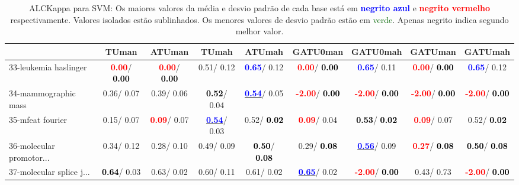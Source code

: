 \begin{table}[h]
\caption{ALCKappa para SVM: Os maiores valores da média e desvio padrão de cada base está em \textcolor{blue}{\textbf{negrito azul}} e \textcolor{red}{\textbf{negrito vermelho}} respectivamente. Valores isolados estão sublinhados. Os menores valores de desvio padrão estão em \textcolor{darkgreen}{verde}. Apenas negrito indica segundo melhor valor.}
\begin{center}\begin{tabular}{lc|c|c|c|c|c|c|c}
 & TUman & \textbf{ATUman} & TUmah & \textbf{ATUmah} & GATU0man & GATU0mah & GATUman & GATUmah\\ \hline 33-leukemia haslinger & \textcolor{red}{\textbf{  0.00}}/\textcolor{black}{\textbf{  0.00}} & \textcolor{red}{\textbf{  0.00}}/\textcolor{black}{\textbf{  0.00}} &   0.51/  0.12 & \textcolor{blue}{\textbf{  0.65}}/  0.12 & \textcolor{red}{\textbf{  0.00}}/\textcolor{black}{\textbf{  0.00}} & \textcolor{blue}{\textbf{  0.65}}/  0.11 & \textcolor{red}{\textbf{  0.00}}/\textcolor{black}{\textbf{  0.00}} & \textcolor{blue}{\textbf{  0.65}}/  0.12 \\
34-mammographic mass &   0.36/  0.07 &   0.39/  0.06 & \textcolor{black}{\textbf{  0.52}}/  0.04 & \underline{\textcolor{blue}{\textbf{  0.54}}}/  0.05 & \textcolor{red}{\textbf{ -2.00}}/\textcolor{black}{\textbf{  0.00}} & \textcolor{red}{\textbf{ -2.00}}/\textcolor{black}{\textbf{  0.00}} & \textcolor{red}{\textbf{ -2.00}}/\textcolor{black}{\textbf{  0.00}} & \textcolor{red}{\textbf{ -2.00}}/\textcolor{black}{\textbf{  0.00}} \\
35-mfeat fourier &   0.15/  0.07 & \textcolor{red}{\textbf{  0.09}}/  0.07 & \underline{\textcolor{blue}{\textbf{  0.54}}}/  0.03 &   0.52/\textcolor{black}{\textbf{  0.02}} & \textcolor{red}{\textbf{  0.09}}/  0.04 & \textcolor{black}{\textbf{  0.53}}/\textcolor{black}{\textbf{  0.02}} & \textcolor{red}{\textbf{  0.09}}/  0.07 &   0.52/\textcolor{black}{\textbf{  0.02}} \\
36-molecular promotor... &   0.34/  0.12 &   0.28/  0.10 &   0.49/  0.09 & \textcolor{black}{\textbf{  0.50}}/\textcolor{black}{\textbf{  0.08}} &   0.29/\textcolor{black}{\textbf{  0.08}} & \underline{\textcolor{blue}{\textbf{  0.56}}}/  0.09 & \textcolor{red}{\textbf{  0.27}}/\textcolor{black}{\textbf{  0.08}} & \textcolor{black}{\textbf{  0.50}}/\textcolor{black}{\textbf{  0.08}} \\
37-molecular splice j... & \textcolor{black}{\textbf{  0.64}}/  0.03 &   0.63/  0.02 &   0.60/  0.11 &   0.61/  0.02 & \underline{\textcolor{blue}{\textbf{  0.65}}}/  0.02 & \textcolor{red}{\textbf{ -2.00}}/\textcolor{black}{\textbf{  0.00}} &   0.43/  0.73 & \textcolor{red}{\textbf{ -2.00}}/\textcolor{black}{\textbf{  0.00}} \\

\end{tabular}
\end{center}
\end{table}
